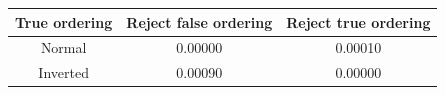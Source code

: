 \begin{tabular}{| c | c | c |}
\hline
True ordering & Reject false ordering & Reject true ordering \\
\hline
Normal & 0.00000 & 0.00010 \\
Inverted & 0.00090 & 0.00000 \\
\hline
\end{tabular}
